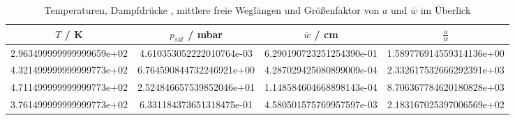 \begin{table}
  \centering
  \caption{Temperaturen, Dampfdrücke , mittlere freie Weglängen und Größenfaktor von
  \texorpdfstring{$a$}{math} und \texorpdfstring{$\bar{w}$}{math} im Überlick }
  \begin{tabular}{S[scientific-notation = fixed , fixed-exponent = 0] S S S[scientific-notation = fixed , fixed-exponent = 0]}
    \toprule
    $T$ / \si{\kelvin} & $p_{sät}$ / \si{\milli \bar} & $\bar{w}$ / \si{\centi \meter} & $\frac{a}{\bar{w}} $ \\
    \midrule
    2.963499999999999659e+02 & 4.610353052222010764e-03 & 6.290190723251254390e-01 & 1.589776914559314136e+00\\
    4.321499999999999773e+02 & 6.764590844732246921e+00 & 4.287029425080899009e-04 & 2.332617532666292391e+03\\
    4.711499999999999773e+02 & 2.524846657539852046e+01 & 1.148584604668898143e-04 & 8.706367784620180828e+03\\
    3.761499999999999773e+02 & 6.331184373651318475e-01 & 4.580501575769957597e-03 & 2.183167025397006569e+02\\
    \bottomrule
  \end{tabular}
  \label{tab:ue}
\end{table}
\FloatBarrier
